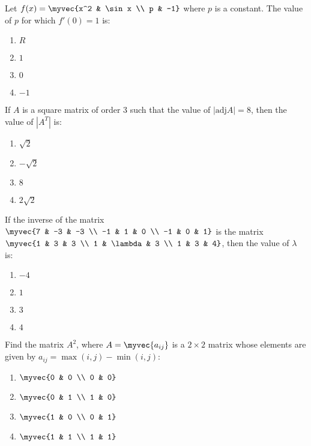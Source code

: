     \item Let $f(x) = \myvec{x^2 & \sin x \\ p & -1}$ where $p$ is a constant. The value of $p$ for which $f'(0) = 1$ is:
    \begin{enumerate}[label=(\alph*)]
        \item $R$
        \item $1$
        \item $0$
        \item $-1$
        \end{enumerate}

        \item If $A$ is a square matrix of order 3 such that the value of $|\text{adj} A| = 8$, then the value of $|A^T|$ is:
    \begin{enumerate}[label=(\alph*)]
        \item $\sqrt{2}$
        \item $-\sqrt{2}$
        \item ${8}$
        \item $2 \sqrt{2}$
    \end{enumerate}

     \item If the inverse of the matrix $\myvec{7 & -3 & -3 \\ -1 & 1 & 0 \\ -1 & 0 & 1}$ is the matrix $\myvec{1 & 3 & 3 \\ 1 & \lambda & 3 \\ 1 & 3 & 4}$, then the value of $\lambda$ is:
   \begin{enumerate}[label=(\alph*)]
    \item $-4$
    \item $1$
    \item $3$
    \item $4$
 \end{enumerate}

 \item Find the matrix $A^2$, where $A = \myvec{a_{ij}}$ is a $2 \times 2$ matrix whose elements are given by $a_{ij} = \max(i, j) - \min(i, j)$:
\begin{enumerate}[label=(\alph*)]
    \item $\myvec{0 & 0 \\ 0 & 0}$
    \item $\myvec{0 & 1 \\ 1 & 0}$
    \item $\myvec{1 & 0 \\ 0 & 1}$
    \item $\myvec{1 & 1 \\ 1 & 1}$
\end{enumerate}

